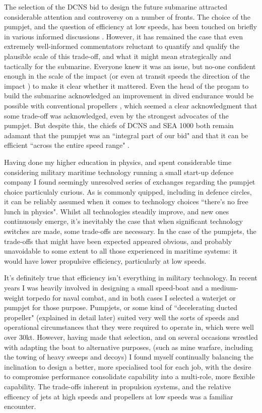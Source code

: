 \documentclass{article}\usepackage[]{graphicx}\usepackage[]{color}
\begin{document}
The selection of the DCNS bid to design the future submarine attracted considerable attention and controversy on a number of fronts. The choice of the pumpjet, and the question of efficiency at low speeds, has been touched on briefly in various informed discussions \parencite{stanford2017} \parencite{davies2017}.  However, it has remained the case that even extremely well-informed commentators reluctant to quantify and qualify the plausible scale of this trade-off, and what it might mean strategically and tactically for the submarine. Everyone knew it was an issue, but no-one confident enough in the scale of the impact (or even at transit speeds the direction of the impact \parencite{davies2017}) to make it clear whether it mattered. Even the head of the progam to build the submarine acknowledged an improvement in dived endurance would be possible with conventional propellers \parencite{sbs2017}, which seemed a clear acknowledgment that some trade-off was acknowledged, even by the strongest advocates of the pumpjet.  But despite this, the chiefs of DCNS and SEA 1000 both remain adamant that the pumpjet was an ``integral part of our bid" \parencite{guillou2017} and that it can be efficient ``across the entire speed range" \parencite{sammut2017}.

Having done my higher education in physics, and spent considerable time considering military maritime technology running a small start-up defence company I found seemingly unresolved series of exchanges regarding the pumpjet choice particulaly curious.  As is commonly quipped, including in defence circles, it can be reliably assumed when it comes to technology choices ``there's no free lunch in physics".  Whilst all technologies steadily improve, and new ones continuously emerge, it's inevitably the case that when significant technology switches are made, some trade-offs are necessary. In the case of the pumpjets, the trade-offs that might have been expected appeared obvious, and probably unavoidable to some extent to all those experienced in maritime systems: it would have lower propulsive efficiency, particularly at low speeds.

It's definitely true that efficiency isn't everything in military technology.  In recent years I was heavily involved in designing a small speed-boat and a medium-weight torpedo for naval combat, and in both cases I selected a waterjet or pumpjet for those purpose. Pumpjets, or some kind of ``decelerating ducted propeller" (explained in detail later) suited very well the sorts of speeds and operational circumstances that they were required to operate in, which were well over 30kt. However, having made that selection, and on several occasions wrestled with adapting the boat to alternative purposes, (such as mine warfare, including the towing of heavy sweeps and decoys) I found myself continually balancing the inclination to design a better, more specialised tool for each job, with the desire to compromise performance consolidate capability into a multi-role, more flexible capability.  The trade-offs inherent in propulsion systems, and the relative efficency of jets at high speeds and propellers at low speeds was a familiar encounter.
\end{document}
